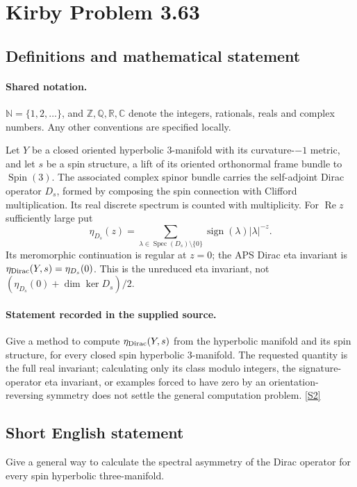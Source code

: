 \documentclass[11pt]{article}
\newcommand{\sref}[2]{\hyperlink{source:#1:#2}{[S#2]}}
\begin{document}
\section{Kirby Problem 3.63}\label{statement}

\subsection{Definitions and mathematical statement}

\paragraph{Shared notation.}$\mathbb N=\{1,2,\ldots\}$, and $\mathbb Z,\mathbb Q,\mathbb R,\mathbb C$ denote the integers, rationals, reals and complex numbers. Any other conventions are specified locally.


Let $Y$ be a closed oriented hyperbolic $3$-manifold with its curvature-$-1$ metric, and let $s$ be a spin structure, a lift of its oriented orthonormal frame bundle to $\operatorname{Spin}(3)$. The associated complex spinor bundle carries the self-adjoint Dirac operator $D_s$, formed by composing the spin connection with Clifford multiplication. Its real discrete spectrum is counted with multiplicity. For $\operatorname{Re}z$ sufficiently large put
\[
\eta_{D_s}(z)=\sum_{\lambda\in\operatorname{Spec}(D_s)\setminus\{0\}}
\operatorname{sign}(\lambda)|\lambda|^{-z}.
\]
Its meromorphic continuation is regular at $z=0$; the APS Dirac eta invariant is $\eta_{\rm Dirac}(Y,s)=\eta_{D_s}(0)$. This is the unreduced eta invariant, not $(\eta_{D_s}(0)+\dim\ker D_s)/2$.
\paragraph{Statement recorded in the supplied source.}
Give a method to compute $\eta_{\rm Dirac}(Y,s)$ from the hyperbolic manifold and its spin structure, for every closed spin hyperbolic $3$-manifold. The requested quantity is the full real invariant; calculating only its class modulo integers, the signature-operator eta invariant, or examples forced to have zero by an orientation-reversing symmetry does not settle the general computation problem. \sref{statement}{2}
\subsection{Short English statement}
Give a general way to calculate the spectral asymmetry of the Dirac operator for every spin hyperbolic three-manifold.
\end{document}
